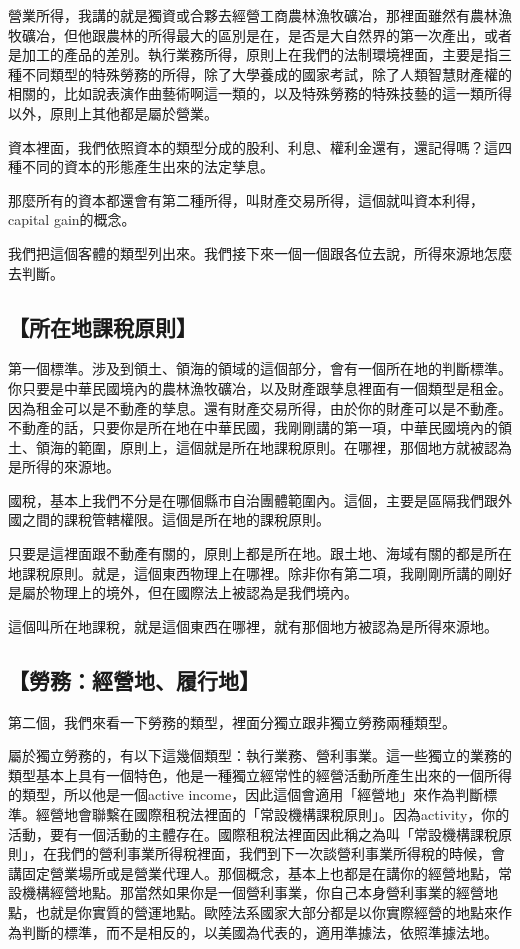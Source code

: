 \documentclass[]{ctexbook}
\begin{document}
營業所得，我講的就是獨資或合夥去經營工商農林漁牧礦冶，那裡面雖然有農林漁牧礦冶，但他跟農林的所得最大的區別是在，是否是大自然界的第一次產出，或者是加工的產品的差別。執行業務所得，原則上在我們的法制環境裡面，主要是指三種不同類型的特殊勞務的所得，除了大學養成的國家考試，除了人類智慧財產權的相關的，比如說表演作曲藝術啊這一類的，以及特殊勞務的特殊技藝的這一類所得以外，原則上其他都是屬於營業。

資本裡面，我們依照資本的類型分成的股利、利息、權利金還有，還記得嗎？這四種不同的資本的形態產生出來的法定孳息。

那麼所有的資本都還會有第二種所得，叫財產交易所得，這個就叫資本利得，capital gain的概念。

我們把這個客體的類型列出來。我們接下來一個一個跟各位去說，所得來源地怎麼去判斷。

\hypertarget{ux6240ux5728ux5730ux8ab2ux7a05ux539fux5247}{%
\subsection{【所在地課稅原則】}\label{ux6240ux5728ux5730ux8ab2ux7a05ux539fux5247}}

第一個標準。涉及到領土、領海的領域的這個部分，會有一個所在地的判斷標準。你只要是中華民國境內的農林漁牧礦冶，以及財產跟孳息裡面有一個類型是租金。因為租金可以是不動產的孳息。還有財產交易所得，由於你的財產可以是不動產。不動產的話，只要你是所在地在中華民國，我剛剛講的第一項，中華民國境內的領土、領海的範圍，原則上，這個就是所在地課稅原則。在哪裡，那個地方就被認為是所得的來源地。

國稅，基本上我們不分是在哪個縣市自治團體範圍內。這個，主要是區隔我們跟外國之間的課稅管轄權限。這個是所在地的課稅原則。

只要是這裡面跟不動產有關的，原則上都是所在地。跟土地、海域有關的都是所在地課稅原則。就是，這個東西物理上在哪裡。除非你有第二項，我剛剛所講的剛好是屬於物理上的境外，但在國際法上被認為是我們境內。

這個叫所在地課稅，就是這個東西在哪裡，就有那個地方被認為是所得來源地。

\hypertarget{ux52deux52d9ux7d93ux71dfux5730ux5c65ux884cux5730}{%
\subsection{【勞務：經營地、履行地】}\label{ux52deux52d9ux7d93ux71dfux5730ux5c65ux884cux5730}}

第二個，我們來看一下勞務的類型，裡面分獨立跟非獨立勞務兩種類型。

屬於獨立勞務的，有以下這幾個類型：執行業務、營利事業。這一些獨立的業務的類型基本上具有一個特色，他是一種獨立經常性的經營活動所產生出來的一個所得的類型，所以他是一個active income，因此這個會適用「經營地」來作為判斷標準。經營地會聯繫在國際租稅法裡面的「常設機構課稅原則」。因為activity，你的活動，要有一個活動的主體存在。國際租稅法裡面因此稱之為叫「常設機構課稅原則」，在我們的營利事業所得稅裡面，我們到下一次談營利事業所得稅的時候，會講固定營業場所或是營業代理人。那個概念，基本上也都是在講你的經營地點，常設機構經營地點。那當然如果你是一個營利事業，你自己本身營利事業的經營地點，也就是你實質的營運地點。歐陸法系國家大部分都是以你實際經營的地點來作為判斷的標準，而不是相反的，以美國為代表的，適用準據法，依照準據法地。
\end{document}
